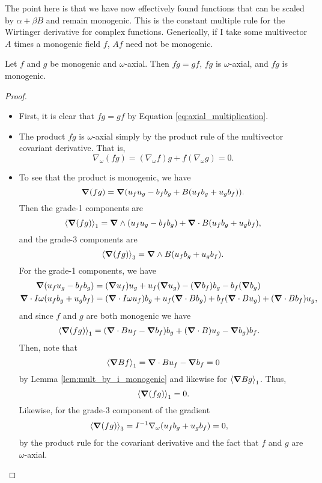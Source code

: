 The point here is that we have now effectively found functions that can be scaled by $\alpha + \beta B$ and remain monogenic.  This is the constant multiple rule for the Wirtinger derivative for complex functions. Generically, if I take some multivector $A$ times a monogenic field $f$, $Af$ need not be monogenic.

\begin{proposition}
    Let $f$ and $g$ be monogenic and $\omega$-axial. Then $fg=gf$, $fg$ is $\omega$-axial, and $fg$ is monogenic.
\end{proposition}
\begin{proof}
    \begin{itemize}
        \item First, it is clear that $fg=gf$ by Equation \ref{eq:axial_multiplication}.
        \item The product $fg$ is $\omega$-axial simply by the product rule of the multivector covariant derivative. That is,
        \[
            \nabla_\omega (fg) = (\nabla_\omega f)g + f(\nabla_\omega g) =0.
        \]

    \item 



To see that the product is monogenic, we have
    \[
        \grad(fg) = \grad(u_fu_g - b_f b_g +  B(u_f b_g + u_g b_f)).
    \]
    Then the grade-1 components are
    \[
        \proj{1}{\grad(fg)}=\grad \wedge (u_f u_g - b_f b_g) + \grad \cdot B(u_f b_g + u_g b_f),
    \]
    and the grade-3 components are
    \[
        \proj{3}{\grad(fg)} = \grad \wedge B (u_f b_g + u_g b_f).
    \]
    For the grade-1 components, we have
    \begin{align*}
        \grad(u_f u_g - b_f b_g) &= (\grad u_f) u_g + u_f (\grad u_g) - (\grad b_f) b_g - b_f (\grad b_g)\\
        \grad \cdot I\omega(u_f b_g + u_g b_f) &= (\grad \cdot I\omega u_f) b_g + u_f (\grad \cdot B b_g) + b_f(\grad \cdot B u_g) + (\grad \cdot B b_f) u_g,
    \end{align*}
    and since $f$ and $g$ are both monogenic we have
    \begin{align*}
        \proj{1}{\grad(fg)} &= (\grad \cdot B u_f - \grad  b_f)b_g + (\grad \cdot B) u_g - \grad  b_g)b_f.
    \end{align*}
    Then, note that 
    \[
        \proj{1}{\grad Bf} = \grad \cdot B u_f - \grad b_f=0
    \]
    by Lemma \ref{lem:mult_by_i_monogenic} and likewise for $\proj{1}{\grad Bg}$. Thus,
    \[
        \proj{1}{\grad(fg)}=0.
    \]
    Likewise, for the grade-3 component of the gradient 
    \begin{align*}
        \proj{3}{\grad(fg)} &= I^{-1} \nabla_\omega (u_f b_g + u_g b_f)=0,
    \end{align*}
    by the product rule for the covariant derivative and the fact that $f$ and $g$ are $\omega$-axial.
\end{itemize}
\end{proof}

